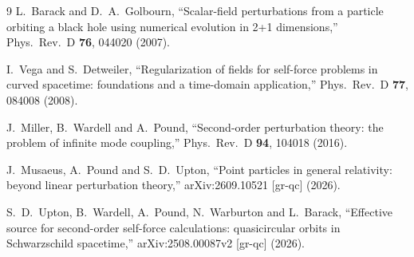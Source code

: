 \documentclass[11pt,a4paper]{article}
\begin{document}
\begin{thebibliography}{9}
L.~Barack and D.~A.~Golbourn,
``Scalar-field perturbations from a particle orbiting a black hole using numerical evolution in 2+1 dimensions,''
Phys.\ Rev.\ D \textbf{76}, 044020 (2007).

I.~Vega and S.~Detweiler,
``Regularization of fields for self-force problems in curved spacetime: foundations and a time-domain application,''
Phys.\ Rev.\ D \textbf{77}, 084008 (2008).

J.~Miller, B.~Wardell and A.~Pound,
``Second-order perturbation theory: the problem of infinite mode coupling,''
Phys.\ Rev.\ D \textbf{94}, 104018 (2016).

J.~Musaeus, A.~Pound and S.~D.~Upton,
``Point particles in general relativity: beyond linear perturbation theory,''
arXiv:2609.10521 [gr-qc] (2026).

S.~D.~Upton, B.~Wardell, A.~Pound, N.~Warburton and L.~Barack,
``Effective source for second-order self-force calculations: quasicircular orbits in Schwarzschild spacetime,''
arXiv:2508.00087v2 [gr-qc] (2026).
\end{thebibliography}
\end{document}
